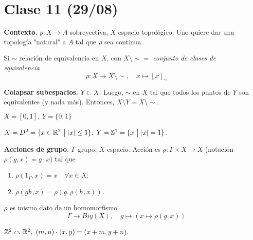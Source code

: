 \section{Clase 11 (29/08)}

\noindent \textbf{Contexto.} $p:X \to A$ sobreyectiva, $X$ espacio topológico. Uno quiere dar una topología "natural" a $A$ tal que $\rho$ sea continua.

\begin{eg}[estándar]
	Si $\sim$ relación de equivalencia en $X$, con $X \setminus \sim =$ \textit{conjunto de clases de equivalencia}
	\[ \rho : X \to X \setminus \sim,\quad x \mapsto [x]_{\sim} \]
\end{eg}

\begin{eg}[1.] 
	\textbf{Colapsar subespacios.} $Y \subset X$. Luego, $\sim$ en $X$ tal que todos los puntos de $Y$ son equivalentes (y nada más). Entonces, $X \setminus Y = X \setminus \sim$. \newline
\end{eg}

\begin{eg}[1.1]
	$X = [0,1],\ Y = \{0,1\}$ \newline
\end{eg}

\begin{eg}[1.2]
	$X = D^2 = \{x\in\mathbb{R}^2 \ \big| \ |x|\leq 1 \},\ Y = \mathbb{S}^1 = \{x \ \big| \ |x| = 1\}$. \newline
\end{eg}

\begin{eg}[2.]
	\textbf{Acciones de grupo.} $\Gamma$ grupo, $X$ espacio. Acción es $\rho : \Gamma \times X \to X$ (notación $\rho(g,x) = g\cdot x$) tal que
	\begin{enumerate}
		\item $\rho(1_{\Gamma},x) = x \quad \forall x \in X$;

		\item $\rho(gh,x) = \rho(g,\rho(h,x))$.
	\end{enumerate}
\end{eg}

\begin{observe}
	$\rho$ es mismo dato de un homomorfismo
	\[ \Gamma \to Biy(X),\quad g \mapsto (x \mapsto \rho(g,x)) \]
\end{observe}

\begin{eg}
	$\Z^2 \curvearrowright \R^2,\ (m,n)\cdot(x,y) = (x+m,y+n)$.
\end{eg}


